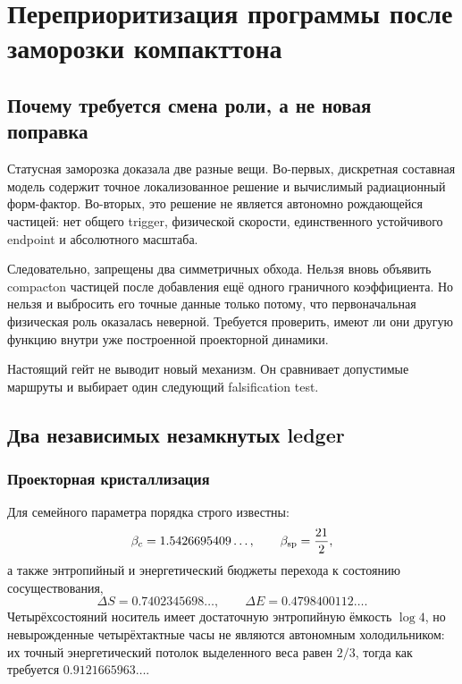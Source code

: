 \chapter{Переприоритизация программы после заморозки компакттона}
\label{ch:v6-spectral-transition-post-compacton-program-reprioritization-gate}

\section{Почему требуется смена роли, а не новая поправка}

Статусная заморозка доказала две разные вещи. Во-первых, дискретная
составная модель содержит точное локализованное решение и вычислимый
радиационный форм-фактор. Во-вторых, это решение не является автономно
рождающейся частицей: нет общего trigger, физической скорости,
единственного устойчивого endpoint и абсолютного масштаба.

Следовательно, запрещены два симметричных обхода. Нельзя вновь объявить
compacton частицей после добавления ещё одного граничного коэффициента.
Но нельзя и выбросить его точные данные только потому, что первоначальная
физическая роль оказалась неверной. Требуется проверить, имеют ли они
другую функцию внутри уже построенной проекторной динамики.

Настоящий гейт не выводит новый механизм. Он сравнивает допустимые маршруты
и выбирает один следующий falsification test.

\section{Два независимых незамкнутых ledger}

\subsection{Проекторная кристаллизация}

Для семейного параметра порядка строго известны:
\begin{equation}
 \beta_c=1.5426695409\ldots,
 \qquad
 \beta_{\rm sp}=\frac{21}{2},
 \label{eq:v6-post-compacton-projective-thresholds}
\end{equation}
а также энтропийный и энергетический бюджеты перехода к состоянию
сосуществования,
\begin{equation}
 \Delta S=0.7402345698\ldots,
 \qquad
 \Delta E=0.4798400112\ldots.
 \label{eq:v6-post-compacton-ordering-budget}
\end{equation}
Четырёхсостояний носитель имеет достаточную энтропийную ёмкость
$\log4$, но невырожденные четырёхтактные часы не являются автономным
холодильником: их точный энергетический потолок выделенного веса равен
$2/3$, тогда как требуется $0.9121665963\ldots$.

